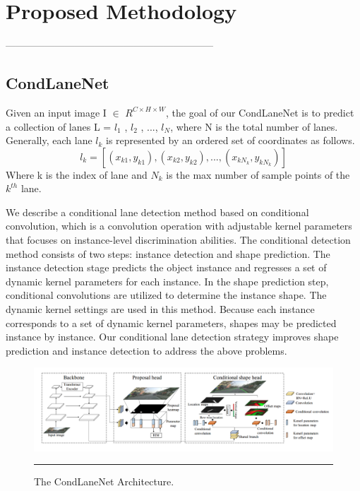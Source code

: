 
\chapter{Proposed Methodology} %

\label{Chapter4} %


---------------------------------------------------------------

\section{CondLaneNet}

Given an input image I $\in$  {$R^{C \times H \times W}$}, the goal of our 
CondLaneNet is to predict a collection of lanes L = {$l_1$ , $l_2$ , ..., $l_N$}, 
where N is the total number of lanes. Generally, each lane $l_k$ is represented by an ordered set of coordinates as follows.
\begin{equation}
l_k = [(x_{k1} , y_{k1} ), (x_{k2} , y_{k2} ), ..., (x_{kN_k} , y_{kN_k} )]
\label{eqn:Einstein}
\end{equation}
 Where k is the index of lane and $N_k$ is the max number of sample points of the $k^{th}$ lane.
 
We describe a conditional lane detection method based on conditional convolution, which is a convolution operation with adjustable kernel parameters that focuses on instance-level discrimination abilities. The conditional detection method consists of two steps: instance detection and shape prediction. The instance detection stage predicts the object instance and regresses a set of dynamic kernel parameters for each instance. In the shape prediction step, conditional convolutions are utilized to determine the instance shape. The dynamic kernel settings are used in this method. Because each instance corresponds to a set of dynamic kernel parameters, shapes may be predicted instance by instance. Our conditional lane
detection strategy improves shape prediction and instance
detection to address the above problems.
\begin{figure}[htbp]
	\centering
		\includegraphics[scale=0.3]{Figures/condlane.png}
		\rule{35em}{0.5pt}
	\caption[CondLaneNet Architecture]{The CondLaneNet Architecture.}
	\label{fig:CondLaneNet Architecture}
\end{figure}

